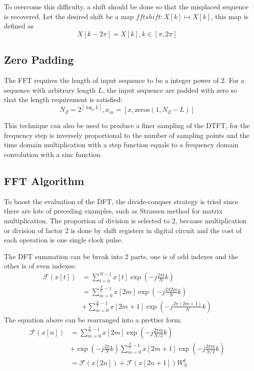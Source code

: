 \documentclass[conference]{IEEEtran}
\begin{document}
To overcome this difficulty, a shift should be done so that the misplaced sequence is recovered. Let the desired shift be a map \( fftshift:X[k]\mapsto X[k] \), this map is defined as
\begin{equation}
	X[k-2\pi]=X[k],k\in[\pi,2\pi ]
\end{equation}

\subsection{Zero Padding}
The FFT requires the length of input sequence to be a integer power of 2. For a sequence with arbitrary length \( L \), the input sequence are padded with zero so that the length requirement is satisfied:
\begin{equation}
	N_{Z}=2^{\left\lceil \log_{2}L \right\rceil },x_{in}=[x,\text{zeros}(1,N_{Z}-L)]
\end{equation}

This technique can also be used to produce a finer sampling of the DTFT, for the frequency step is inversely proportional to the number of sampling points and the time domain multiplication with a step function equals to a frequency domain convolution with a sinc function.

\subsection{FFT Algorithm}
To boost the evaluation of the DFT, the divide-conquer strategy is tried since there are lots of preceding examples, such as Strassen method for matrix multiplication. The proportion of division is selected to 2, because multiplication or division of factor 2 is done by shift registers in digital circuit and the cost of each operation is one single clock pulse.

The DFT summation can be break into 2 parts, one is of odd indexes and the other is of even indexes:
\begin{equation}
	\begin{aligned}
		\mathcal{F} (x[t]) & =\sum_{t=0}^{N-1} x[t]\exp(-j \frac{2\pi t}{N}k)             \\
		                   & =\sum_{m=0}^{\frac{N}{2}-1} x[2m]\exp(-j \frac{2\pi 2m}{N}k) \\&+\sum_{m=0}^{\frac{N}{2}-1} x[2m+1]\exp(-j \frac{2\pi (2m+1)}{N}k)
	\end{aligned}
\end{equation}
The equation above can be rearranged into a prettier form:
\begin{equation}
	\begin{aligned}
		\mathcal{F} (x[n]) & =\sum_{m=0}^{\frac{N}{2}-1} x[2m]\exp(-j \frac{2\pi m}{N/2}k) \\&+\exp(-j \frac{2\pi}{N}k)\sum_{m=0}^{\frac{N}{2}-1} x[2m+1]\exp(-j \frac{2\pi m}{N/2}k)\\
		                   & =\mathcal{F}(x[2n])+\mathcal{F} (x[2n+1])W_{N}^{k}
	\end{aligned}
\end{equation}
\end{document}
